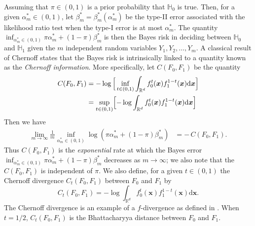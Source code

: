 \documentclass[10pt]{article}
\begin{document}
Assuming that $\pi \in (0,1)$ is a prior probability that $\mathbb{H}_0$ is true. Then, for a given $\alpha_m^{*} \in (0,1)$, let $\beta_m^{*} = \beta_m^{*}(\alpha_m^{*})$ be the type-II error associated with the likelihood ratio test when the type-I error is at most $\alpha_m^{*}$. The quantity $\inf_{\alpha_m^{*} \in (0,1)} \pi \alpha_m^{*} + (1 - \pi) \beta_m^{*}$ is then the Bayes risk in deciding between $\mathbb{H}_0$ and $\mathbb{H}_1$ given the $m$ independent random variables $Y_1, Y_2, \dots, Y_m$. A classical result of Chernoff \cite{chernoff_1952} states that the Bayes risk is intrinsically linked to a quantity known as the {\em Chernoff information}. More specifically, let $C(F_0, F_1)$ be the quantity
\begin{equation}
\label{eq:chernoff-defn}
\begin{split} C(F_0, F_1) & = - \log \, \Bigl[\, \inf_{t \in (0,1)} \int_{\mathbb{R}^{d}} f_0^{t}(\bm{x}) f_1^{1-t}(\bm{x}) \mathrm{d}\bm{x} \Bigr] \\
&= \sup_{t \in (0,1)} \Bigl[ - \log \int_{\mathbb{R}^{d}} f_0^{t}(\bm{x}) f_1^{1-t}(\bm{x}) \mathrm{d}\bm{x} \Bigr]
\end{split}
\end{equation}
Then we have
\begin{equation}
\label{eq:chernoff-binary}
\begin{split}
\lim_{m \rightarrow \infty} \frac{1}{m} \inf_{\alpha_m^{*} \in (0,1)} \log( \pi \alpha_m^{*} + (1 - \pi) \beta_m^{*}) & = - \, C(F_0, F_1).
\end{split}
\end{equation}
Thus $C(F_0, F_1)$ is the {\em exponential} rate at which the Bayes error $\inf_{\alpha_m^{*} \in (0,1)} \pi \alpha_m^{*} + (1 - \pi) \beta_m^{*}$ decreases as $m \rightarrow \infty$; we also note that the $C(F_0, F_1)$ is independent of $\pi$. We also define, for a given $t \in (0,1)$ the Chernoff divergence $C_t(F_0, F_1) $ between $F_0$ and $F_1$ by
$$ C_{t}(F_0,F_1) = - \log \int_{\mathbb{R}^{d}} f_0^{t}(\bm{x}) f_1^{1-t}(\bm{x}) \mathrm{d}\bm{x}. $$
The Chernoff divergence is an example of a $f$-divergence as defined in \cite{Csizar}. When $t = 1/2$, $C_t(F_0,F_1)$ is the Bhattacharyya distance between $F_0$ and $F_1$.
\end{document}
